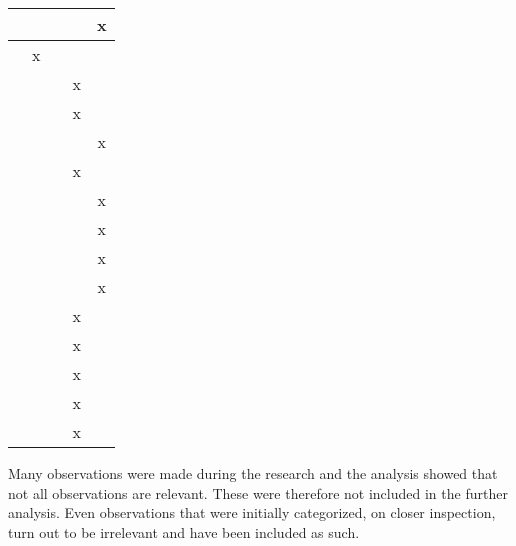 \begin{xltabular}{\textwidth}{|l|c|c|c|c|}
                   &   &   &   & x \\ \hline
                 & x &   &   &   \\ \hline
                       &   &   & x &   \\ \hline
                 &   &   & x &   \\ \hline
                       &   &   &   & x \\ \hline
                                 &   &   & x &   \\ \hline
                        &   &   &   & x \\ \hline
                     &   &   &   & x \\ \hline
                        &   &   &   & x \\ \hline
                         &   &   &   & x \\ \hline
                         &   &   & x &   \\ \hline
                                 &   &   & x &   \\ \hline
                               &   &   & x &   \\ \hline
                               &   &   & x &   \\ \hline
              &   &   & x &   \\ \hline
\end{xltabular}

Many observations were made during the research and the analysis showed that not all observations are relevant.
These were therefore not included in the further analysis.
Even observations that were initially categorized, on closer inspection, turn out to be irrelevant and have been included as such.












